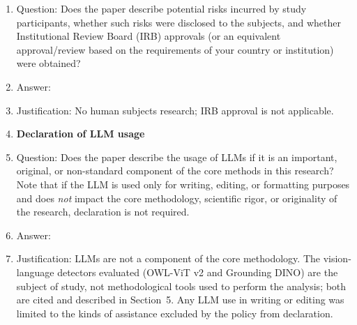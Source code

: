 \begin{enumerate}
    \item[] Question: Does the paper describe potential risks incurred by study participants, whether such risks were disclosed to the subjects, and whether Institutional Review Board (IRB) approvals (or an equivalent approval/review based on the requirements of your country or institution) were obtained?
    \item[] Answer: \answerNA{}
    \item[] Justification: No human subjects research; IRB approval is not applicable.
\item {\bf Declaration of LLM usage}
    \item[] Question: Does the paper describe the usage of LLMs if it is an important, original, or non-standard component of the core methods in this research? Note that if the LLM is used only for writing, editing, or formatting purposes and does \emph{not} impact the core methodology, scientific rigor, or originality of the research, declaration is not required.
    \item[] Answer: \answerNA{}
    \item[] Justification: LLMs are not a component of the core methodology. The vision-language detectors evaluated (OWL-ViT v2 and Grounding DINO) are the subject of study, not methodological tools used to perform the analysis; both are cited and described in Section~5. Any LLM use in writing or editing was limited to the kinds of assistance excluded by the policy from declaration.
\end{enumerate}

